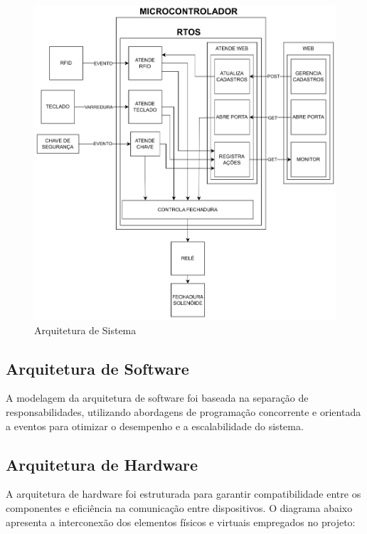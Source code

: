 \documentclass{article}
\begin{document}
\begin{figure}[H]
    \centering
    \includegraphics[width=\textwidth]{./images/arquitetura_sistema.png}
    \caption{Arquitetura de Sistema}
    \label{fig:arquitetura_sistema}
\end{figure}

\subsection*{Arquitetura de Software}
A modelagem da arquitetura de software foi baseada na separação de responsabilidades, utilizando abordagens de programação concorrente e orientada a eventos para otimizar o desempenho e a escalabilidade do sistema.

\subsection*{Arquitetura de Hardware}
A arquitetura de hardware foi estruturada para garantir compatibilidade entre os componentes e eficiência na comunicação entre dispositivos. O diagrama abaixo apresenta a interconexão dos elementos físicos e virtuais empregados no projeto:
\end{document}
